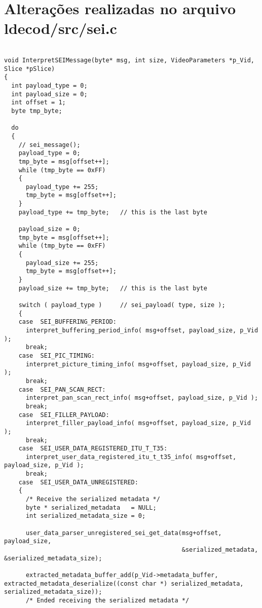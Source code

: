 \section{Alterações realizadas no arquivo ldecod/src/sei.c }

\begin{lstlisting}

void InterpretSEIMessage(byte* msg, int size, VideoParameters *p_Vid, Slice *pSlice)
{
  int payload_type = 0;
  int payload_size = 0;
  int offset = 1;
  byte tmp_byte;
  
  do
  {
    // sei_message();
    payload_type = 0;
    tmp_byte = msg[offset++];
    while (tmp_byte == 0xFF)
    {
      payload_type += 255;
      tmp_byte = msg[offset++];
    }
    payload_type += tmp_byte;   // this is the last byte

    payload_size = 0;
    tmp_byte = msg[offset++];
    while (tmp_byte == 0xFF)
    {
      payload_size += 255;
      tmp_byte = msg[offset++];
    }
    payload_size += tmp_byte;   // this is the last byte

    switch ( payload_type )     // sei_payload( type, size );
    {
    case  SEI_BUFFERING_PERIOD:
      interpret_buffering_period_info( msg+offset, payload_size, p_Vid );
      break;
    case  SEI_PIC_TIMING:
      interpret_picture_timing_info( msg+offset, payload_size, p_Vid );
      break;
    case  SEI_PAN_SCAN_RECT:
      interpret_pan_scan_rect_info( msg+offset, payload_size, p_Vid );
      break;
    case  SEI_FILLER_PAYLOAD:
      interpret_filler_payload_info( msg+offset, payload_size, p_Vid );
      break;
    case  SEI_USER_DATA_REGISTERED_ITU_T_T35:
      interpret_user_data_registered_itu_t_t35_info( msg+offset, payload_size, p_Vid );
      break;
    case  SEI_USER_DATA_UNREGISTERED:
    {
      /* Receive the serialized metadata */
      byte * serialized_metadata   = NULL;
      int serialized_metadata_size = 0;

      user_data_parser_unregistered_sei_get_data(msg+offset, payload_size, 
                                                 &serialized_metadata, &serialized_metadata_size);

      extracted_metadata_buffer_add(p_Vid->metadata_buffer, extracted_metadata_deserialize((const char *) serialized_metadata, serialized_metadata_size));
      /* Ended receiving the serialized metadata */


\end{lstlisting}
